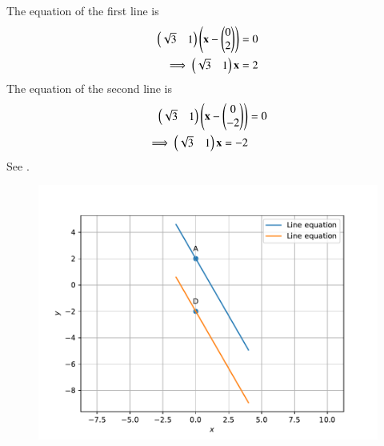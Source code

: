 The equation of the first line is 
\begin{align}
	\begin{pmatrix}\sqrt{3} &1\end{pmatrix}\begin{pmatrix}\mathbf{x}-\begin{pmatrix}0\\2\end{pmatrix}\end{pmatrix}&=0
	\\
	\implies 
	\begin{pmatrix}\sqrt{3}&1\end{pmatrix}
	\mathbf{x}&=2
\end{align}
The equation of the second line is 
\begin{align}
	\begin{pmatrix}\sqrt{3} &1\end{pmatrix}\begin{pmatrix}\mathbf{x}-\begin{pmatrix}0\\-2\end{pmatrix}\end{pmatrix}&=0
	\\
	\implies 
	\begin{pmatrix}\sqrt{3}&1\end{pmatrix}
\mathbf{x}=-2
\end{align}
See
		.
	\begin{figure}[!ht]
		\centering
 \includegraphics[width=\columnwidth]{chapters/11/10/2/14/figs/fig.pdf}
		\caption{}
		\label{fig:11/10/2/14}
  	\end{figure}
